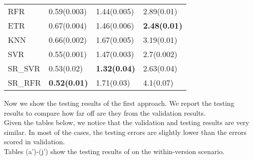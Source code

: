 \documentclass[]{article}
\begin{document}
\begin{table}[h]
\begin{adjustwidth}{-3.4cm}{}
\begin{subtable}{9cm}
\begin{tabular}{llll}
					RFR & 0.59(0.003) & 1.44(0.005) & 2.89(0.01)\\ 
					ETR & 0.67(0.004) & 1.46(0.006) & \bfseries 2.48(0.01)\\ 
					KNN & 0.66(0.002) & 1.67(0.005) & 3.19(0.01)\\ 
					SVR & 0.55(0.001) & 1.47(0.003) & 2.7(0.002)\\ 
					SR\_SVR & 0.53(0.02) & \bfseries 1.32(0.04) & 2.63(0.04)\\
					SR\_RFR & \bfseries 0.52(0.01) & 1.71(0.03) & 4.1(0.07)\\ \hline
				\end{tabular}
			\end{subtable} 
		\end{adjustwidth}
	\end{table}

Now we show the testing results of the first approach. We report the testing results to compare how far off are they from the validation results.\\
Given the tables below, we notice that the validation and testing results are very similar. In most of the cases, the testing errors are slightly lower than the errors scored in validation.\\
Tables (a')-(j') show the testing results of on the within-version scenario.\\
\end{document}
